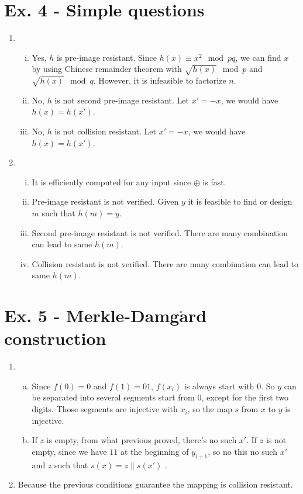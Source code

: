 \documentclass[11pt,a4paper]{article}
\begin{document}
\section*{Ex. 4 - Simple questions}
\begin{enumerate}
\item\begin{enumerate}[(i)]
\item Yes, $h$ is pre-image resistant. Since $h(x) \equiv x^{2} \mod pq$, we can find $x$ by using Chinese remainder theorem with $\sqrt{h(x)} \mod p$ and $\sqrt{h(x)} \mod q$. However, it is infeasible to factorize $n$.

\item No, $h$ is not second pre-image resistant. Let $x' = -x$, we would have $h(x) = h(x')$.

\item No, $h$ is not collision resistant. Let $x' = -x$, we would have $h(x) = h(x')$.
\end{enumerate}

\item\begin{enumerate}[(i)]
\item It is efficiently computed for any input since $\oplus$ is fast.

\item Pre-image resistant is not verified. Given $y$ it is feasible to find or design $m$ such that $h(m) = y$.

\item Second pre-image resistant is not verified. There are many combination can lead to same $h(m)$.

\item Collision resistant is not verified. There are many combination can lead to same $h(m)$.
\end{enumerate}
\end{enumerate}



\section*{Ex. 5 - Merkle-Damg$\mathrm{\mathbf{\mathring{a}}}$rd construction}
\begin{enumerate}
\item \begin{enumerate}[a)]
\item Since $f(0)=0$ and $f(1)=01$, $f(x_{i})$ is always start with $0$. So $y$ can be separated into several segments start from $0$, except for the first two digits. Those segments are injective with $x_{i}$, so the map $s$ from $x$ to $y$ is injective.

\item If $z$ is empty, from what previous proved, there's no such $x'$. If $z$ is not empty, since we have $11$ at the beginning of $y_{i+1}$, so no this no such $x'$ and $z$ such that $s(x) = z \| s(x')$ .
\end{enumerate}

\item Because the previous conditions guarantee the mapping is collision resistant.
\end{enumerate}
\end{document}
